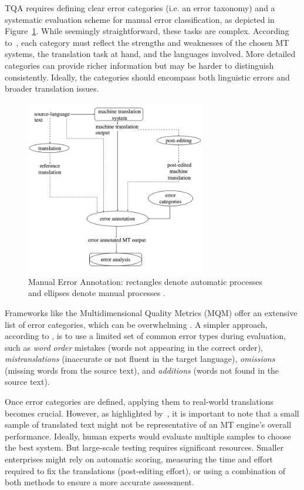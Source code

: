 {{TQA requires defining clear error categories (i.e. an error taxonomy) and a systematic evaluation scheme for manual error classification, as depicted in Figure~\ref{fig: human-evaluation}. While seemingly straightforward, these tasks are complex. According to~\textcite{popovic-2018}, each category must reflect the strengths and weaknesses of the chosen MT systems, the translation task at hand, and the languages involved. More detailed categories can provide richer information but may be harder to distinguish consistently. Ideally, the categories should encompass both linguistic errors and broader translation issues.

\begin{figure}[htb]
\centering
\includegraphics[width=0.7\textwidth]{textual/Figuras/human evaluation.png}
\caption{Manual Error Annotation: rectangles denote automatic processes and ellipses denote manual processes \parencite{popovic-2018}.} 
\label{fig: human-evaluation} 
\end{figure}

Frameworks like the Multidimensional Quality Metrics (MQM) offer an extensive list of error categories, which can be overwhelming \parencite{Mariana2014TheMQ}. A simpler approach, according to \textcite{Moorkens-2018}, is to use a limited set of common error types during evaluation, such as \emph{word order} mistakes (words not appearing in the correct order), \emph{mistranslations} (inaccurate or not fluent in the target language), \emph{omissions} (missing words from the source text), and \emph{additions} (words not found in the source text).

Once error categories are defined, applying them to real-world translations becomes crucial. However, as highlighted by~\textcite{Rossi2022}, it is important to note that a small sample of translated text might not be representative of an MT engine's overall performance. Ideally, human experts would evaluate multiple samples to choose the best system. But large-scale testing requires significant resources. Smaller enterprises might rely on automatic scoring, measuring the time and effort required to fix the translations (post-editing effort), or using a combination of both methods to ensure a more accurate assessment.


}}
